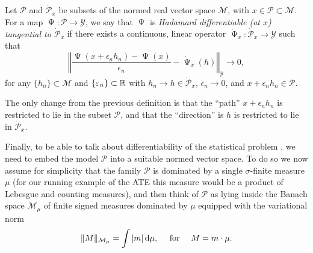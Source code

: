 \documentclass[a4,danish]{article}
\DeclareMathOperator{\TT}{\Psi}
\begin{document}
\begin{definition}
  Let $\mathcal{P}$ and $\dot{\mathcal{P}}_x$ be subsets of the normed real vector space
  $\mathcal{M}$, with $x \in \mathcal{P} \subset \mathcal{M}$. For a map
  $\TT \colon \mathcal{P} \rightarrow \mathcal{Y}$, we say that $\TT$ is \textit{Hadamard
    differentiable (at $x$) tangential to $\dot{\mathcal{P}}_x$} if there exists a continuous,
  linear operator $\dot{\TT}_x \colon \dot{\mathcal{P}}_x \rightarrow \mathcal{Y}$ such that
  \begin{equation*}
    \left\Vert
      \frac{\TT(x + \epsilon_n h_n) - \TT(x)}{\epsilon_n} - \dot{\TT}_x(h)
    \right\Vert_{\mathcal{Y}} \longrightarrow 0, 
  \end{equation*}
  for any $\{h_n\} \subset \mathcal{M}$ and $\{\varepsilon_n\} \subset \mathbb{R}$ with
  $h_n \rightarrow h \in \dot{\mathcal{P}}_x$, $\epsilon_n\rightarrow 0$, and
  $x + \epsilon_n h_n \in \mathcal{P}$.
\end{definition}

The only change from the previous definition is that the ``path'' $x + \epsilon_n h_n$ is restricted
to lie in the subset $\mathcal{P}$, and that the ``direction'' is $h$ is restricted to lie in
$\dot{\mathcal{P}}_x$.

Finally, to be able to talk about differentiability of the statistical
problem \fxnote*{define this earlier}{$(\mathcal{P}, \TT)$}, we need
to embed the model $\mathcal{P}$ into a suitable normed vector
space. To do so we now assume for simplicity that the family
$\mathcal{P}$ is dominated by a single $\sigma$-finite measure $\mu$
(for our running example of the ATE this measure would be a product of
Lebesgue and counting measures), and then think of $\mathcal{P}$ as
lying inside the Banach space $\mathcal{M}_{\mu}$ of finite signed
measures dominated by $\mu$ equipped with the variational norm
\begin{equation*}
  \Vert M \Vert_{\mathcal{M}_{\mu}} = \int |m |\mathop{}\!\mathrm{d} \mu, \quad \text{ for } \quad M = m \cdot \mu.
\end{equation*}
\end{document}
